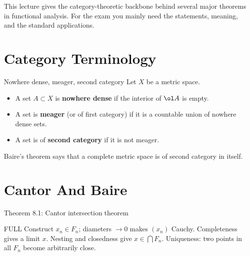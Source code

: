 \documentclass[header={Lecture 5 Exam Study Notes}]{study-note}
\begin{document}

\vspace{0.8em}

\begin{focusbox}
This lecture gives the category-theoretic backbone behind several major theorems in functional analysis. For the exam you mainly need the statements, meaning, and the standard applications.
\end{focusbox}

\tableofcontents

\section{Category Terminology}

\begin{defbox}{Nowhere dense, meager, second category}
Let $X$ be a metric space.
\begin{itemize}
\item A set $A\subset X$ is \textbf{nowhere dense} if the interior of $\ol A$ is empty.
\item A set is \textbf{meager} (or of first category) if it is a countable union of nowhere dense sets.
\item A set is of \textbf{second category} if it is not meager.
\end{itemize}
\end{defbox}

\begin{focusbox}
Baire's theorem says that a complete metric space is of second category in itself.
\end{focusbox}

\section{Cantor And Baire}

\begin{thmbox}{Theorem 8.1: Cantor intersection theorem}
\thmCantorIntersection
\end{thmbox}

\begin{prooflevelbox}{FULL}
Construct $x_n\in F_n$; diameters $\to 0$ makes $(x_n)$ Cauchy. Completeness gives a limit $x$. Nesting and closedness give $x\in\bigcap F_n$. Uniqueness: two points in all $F_n$ become arbitrarily close.
\end{prooflevelbox}
\end{document}
